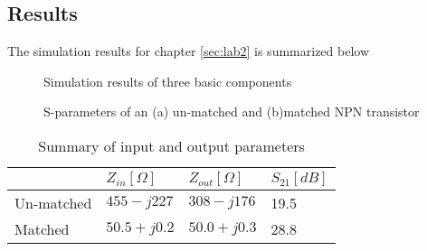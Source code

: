 \documentclass[report.tex]{subfiles}
\begin{document}
\clearpage
\subsection{Results}
\label{sec:lab2_results}
The simulation results for chapter \ref{sec:lab2} is summarized below

\begin{figure}[h]
    \centering
    \caption{Simulation results of three basic components}
\end{figure}
\clearpage

\clearpage

\begin{figure}
    \centering
    \caption{S-parameters of an (a) un-matched and (b)matched NPN transistor}
\end{figure}

%

\begin{table}
    \centering
    \caption{Summary of input and output parameters}
    \begin{tabular}{l | l l l}
        & $Z_{in} [\Omega]$ & $Z_{out} [\Omega]$ & $S_{21} [dB]$\\
        \hline
        Un-matched & $455-j227$  & $308-j176$  & 19.5 \\
        Matched    & $50.5+j0.2$ & $50.0+j0.3$ & 28.8 \\
    \end{tabular}
\end{table}

\clearpage
\end{document}
